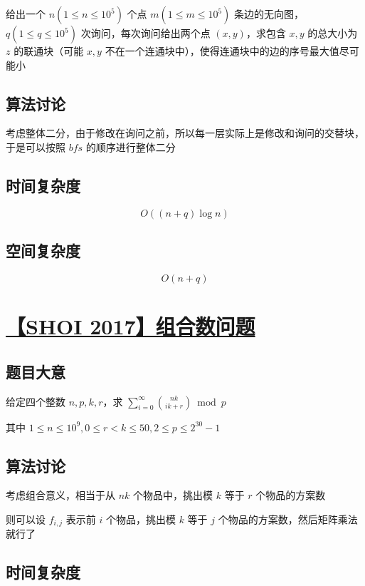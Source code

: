 \documentclass[UTF8]{article}
\begin{document}
给出一个 $n(1 \le n \le 10^5)$ 个点 $m(1 \le m \le 10^5)$ 条边的无向图，$q(1 \le q \le 10^5)$ 次询问，每次询问给出两个点 $(x, y)$，求包含 $x, y$ 的总大小为 $z$ 的联通块（可能 $x, y$ 不在一个连通块中），使得连通块中的边的序号最大值尽可能小

\subsection{算法讨论}

考虑整体二分，由于修改在询问之前，所以每一层实际上是修改和询问的交替块，于是可以按照 $bfs$ 的顺序进行整体二分

\subsection{时间复杂度}

$$
O((n+q) \log n)
$$

\subsection{空间复杂度}

$$
O(n+q)
$$

\section{\href{https://www.lydsy.com/JudgeOnline/problem.php?id=4870}{【SHOI 2017】组合数问题}}

\subsection{题目大意}

给定四个整数 $n, p, k, r$，求 $\sum_{i=0}^{\infty}{nk \choose ik+r} \bmod p$

其中 $1 \le n \le 10^9, 0 \le r < k \le 50, 2 \le p \le 2^{30}-1$

\subsection{算法讨论}

考虑组合意义，相当于从 $nk$ 个物品中，挑出模 $k$ 等于 $r$ 个物品的方案数

则可以设 $f_{i,j}$ 表示前 $i$ 个物品，挑出模 $k$ 等于 $j$ 个物品的方案数，然后矩阵乘法就行了

\subsection{时间复杂度}
\end{document}
